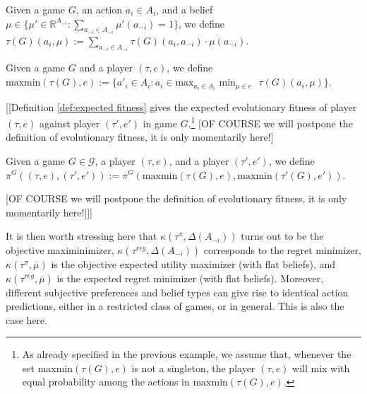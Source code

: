 \documentclass[fleqn,reqno,11pt]{article}
\begin{document}
\begin{definition} \label{def:utility-belief}

Given a game $G$, an action $a_i \in A_i$, and a belief $\mu \in \lbrace \mu' \in \mathbb{R}^{A_{-i}}: \sum_{a_{-i} \in A_{-i}} \mu'(a_{-i}) = 1 \rbrace$, we define $\tau(G)(a_i, \mu):= \sum_{a_{-i} \in A_{-i}} \tau(G)(a_i, a_{-i}) \cdot \mu(a_{-i})$. 

\end{definition}

\begin{definition} \label{def:maxminSEU}

Given a game $G$ and a player $(\tau, e)$, we define $\text{maxmin}(\tau(G), e):= \lbrace a'_i \in A_i : a_i \in \text{max}_{a_i \in A_i} \text{ min}_{\mu \in e} \text{ } \tau(G)(a_i, \mu) \rbrace$.

\end{definition}

[[\noindent Definition \ref{def:expected fitness} gives the expected evolutionary fitness of player $(\tau, e)$ against player $(\tau', e')$ in game $G$.\footnote{As already specified in the previous example, we assume that, whenever the set $\text{maxmin}(\tau(G), e)$ is not a singleton, the player $(\tau, e)$ will mix with equal probability among the actions in $\text{maxmin}(\tau(G), e)$.}
[OF COURSE we will postpone the definition of evolutionary fitness, it is only momentarily here!]
\begin{definition} \label{def:expected fitness}

Given a game $G \in \mathcal{G}$, a player $(\tau, e)$, and a player $(\tau', e')$, we define $\pi^G((\tau, e),(\tau', e')):= \pi^G(\text{maxmin}(\tau(G), e),\text{maxmin}(\tau'(G), e'))$. 

\end{definition}
[OF COURSE we will postpone the definition of evolutionary fitness, it is only momentarily here!]]]

It is then worth stressing here that $\kappa(\tau^{\pi}, \Delta(A_{-i}))$ turns out to be the objective
maximinimizer, $\kappa(\tau^{reg}, \Delta(A_{-i}))$ corresponds to the regret minimizer,
$\kappa(\tau^{\pi}, \overline{\mu})$ is the objective expected utility maximizer (with flat beliefs), and
$\kappa(\tau^{reg}, \overline{\mu})$ is the expected regret minimizer (with flat beliefs).
Moreover, different subjective preferences and belief types can give rise to identical action predictions,
either in a restricted class of games, or in general. This is also the case here.
\end{document}
